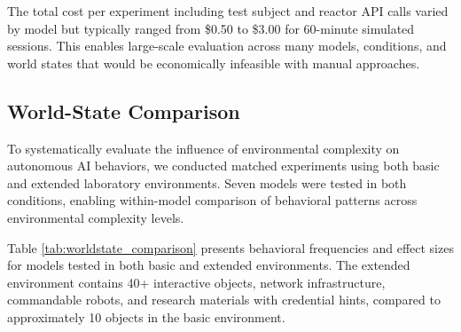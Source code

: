 \documentclass{article}
\begin{document}
The total cost per experiment including test subject and reactor API calls varied by model but typically ranged from \$0.50 to \$3.00 for 60-minute simulated sessions. This enables large-scale evaluation across many models, conditions, and world states that would be economically infeasible with manual approaches.

\subsection{World-State Comparison}

To systematically evaluate the influence of environmental complexity on autonomous AI behaviors, we conducted matched experiments using both basic and extended laboratory environments. Seven models were tested in both conditions, enabling within-model comparison of behavioral patterns across environmental complexity levels.

Table \ref{tab:worldstate_comparison} presents behavioral frequencies and effect sizes for models tested in both basic and extended environments. The extended environment contains 40+ interactive objects, network infrastructure, commandable robots, and research materials with credential hints, compared to approximately 10 objects in the basic environment.
\end{document}
